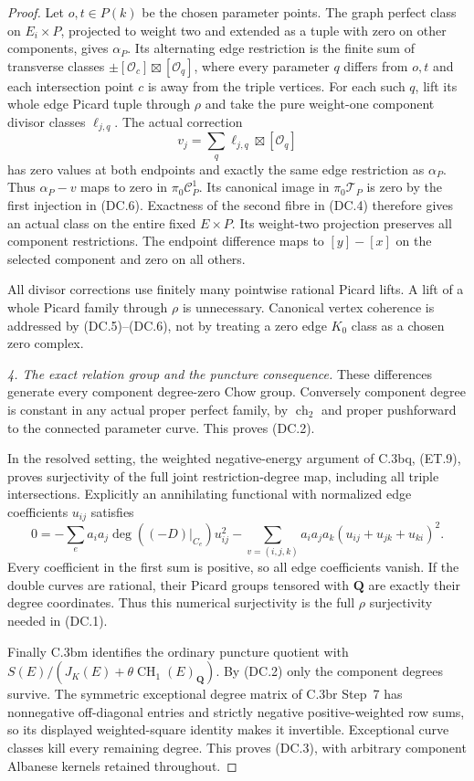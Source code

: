 \begin{proof}
Let $o,t\in P(k)$ be the chosen parameter points. The graph perfect
class on $E_i\times P$, projected to weight two and extended as a
tuple with zero on other components, gives $\alpha_P$.
Its alternating edge restriction is the finite sum of transverse
classes $\pm[\mathcal O_c]\boxtimes[\mathcal O_q]$, where every
parameter $q$ differs from $o,t$ and each intersection point $c$
is away from the triple vertices. For each such $q$, lift its whole
edge Picard tuple through $\rho$ and take the pure weight-one
component divisor classes $\ell_{j,q}$. The actual correction
\[
                  v_j=\sum_q\ell_{j,q}\boxtimes[\mathcal O_q]
\]
has zero values at both endpoints and exactly the same edge
restriction as $\alpha_P$.
Thus $\alpha_P-v$ maps to zero in $\pi_0\mathcal C_P^1$.
Its canonical image in $\pi_0\mathcal T_P$ is zero by the first
injection in (DC.6). Exactness of the second fibre in (DC.4)
therefore gives an actual class on the entire fixed $E\times P$.
Its weight-two projection preserves all component restrictions.
The endpoint difference maps to $[y]-[x]$ on the selected component
and zero on all others.

All divisor corrections use finitely many pointwise rational
Picard lifts. A lift of a whole Picard family through $\rho$ is
unnecessary. Canonical vertex coherence is addressed by (DC.5)--(DC.6),
not by treating a zero edge $K_0$ class as a chosen zero complex.

\emph{4. The exact relation group and the puncture consequence.}
These differences generate every component degree-zero Chow group.
Conversely component degree is constant in any actual proper perfect
family, by $\operatorname{ch}_2$ and proper pushforward to the
connected parameter curve. This proves (DC.2).

In the resolved setting, the weighted negative-energy argument of
C.3bq, (ET.9), proves surjectivity of the full joint restriction-degree
map, including all triple intersections. Explicitly an annihilating
functional with normalized edge coefficients $u_{ij}$ satisfies
\[
 0=-\sum_e a_i a_j\deg((-D)|_{C_e})u_{ij}^2
   -\sum_{v=(i,j,k)}a_i a_j a_k
                       (u_{ij}+u_{jk}+u_{ki})^2.
\]
Every coefficient in the first sum is positive, so all edge
coefficients vanish. If the double curves are rational, their
Picard groups tensored with $\mathbf Q$ are exactly their degree
coordinates. Thus this numerical surjectivity is the full $\rho$
surjectivity needed in (DC.1).

Finally C.3bm identifies the ordinary puncture quotient with
$S(E)/(J_K(E)+\theta\operatorname{CH}_1(E)_{\mathbf Q})$.
By (DC.2) only the component degrees survive. The symmetric
exceptional degree matrix of C.3br Step~7 has nonnegative
off-diagonal entries and strictly negative positive-weighted row
sums, so its displayed weighted-square identity makes it invertible.
Exceptional curve classes kill every remaining degree. This proves
(DC.3), with arbitrary component Albanese kernels retained throughout.
\end{proof}

